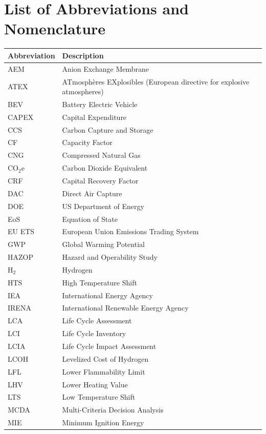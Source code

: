 \documentclass[12pt,twoside,openany]{book}
\begin{document}
\chapter*{List of Abbreviations and Nomenclature}

\begin{longtable}{L{4cm} L{10cm}}
\hline
\textbf{Abbreviation} & \textbf{Description} \\
\hline
\endhead
AEM & Anion Exchange Membrane \\
ATEX & ATmosphères EXplosibles (European directive for explosive atmospheres) \\
BEV & Battery Electric Vehicle \\
CAPEX & Capital Expenditure \\
CCS & Carbon Capture and Storage \\
CF & Capacity Factor \\
CNG & Compressed Natural Gas \\
CO$_2$e & Carbon Dioxide Equivalent \\
CRF & Capital Recovery Factor \\
DAC & Direct Air Capture \\
DOE & US Department of Energy \\
EoS & Equation of State \\
EU ETS & European Union Emissions Trading System \\
GWP & Global Warming Potential \\
HAZOP & Hazard and Operability Study \\
H$_2$ & Hydrogen \\
HTS & High Temperature Shift \\
IEA & International Energy Agency \\
IRENA & International Renewable Energy Agency \\
LCA & Life Cycle Assessment \\
LCI & Life Cycle Inventory \\
LCIA & Life Cycle Impact Assessment \\
LCOH & Levelized Cost of Hydrogen \\
LFL & Lower Flammability Limit \\
LHV & Lower Heating Value \\
LTS & Low Temperature Shift \\
MCDA & Multi-Criteria Decision Analysis \\
MIE & Minimum Ignition Energy \\

\end{longtable}
\end{document}
